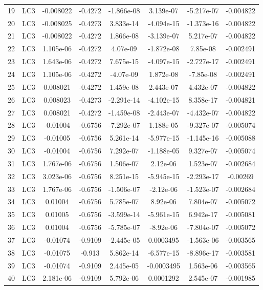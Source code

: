 \documentclass{article}%
\begin{document}
\begin{longtable}{| c c | c c c c c c |}
19&LC3&{-}0.008022&{-}0.4272&{-}1.866e{-}08&3.139e{-}07&{-}5.217e{-}07&{-}0.004822\\%
20&LC3&{-}0.008025&{-}0.4273&3.833e{-}14&{-}4.094e{-}15&{-}1.373e{-}16&{-}0.004822\\%
21&LC3&{-}0.008022&{-}0.4272&1.866e{-}08&{-}3.139e{-}07&5.217e{-}07&{-}0.004822\\%
22&LC3&1.105e{-}06&{-}0.4272&4.07e{-}09&{-}1.872e{-}08&7.85e{-}08&{-}0.002491\\%
23&LC3&1.643e{-}06&{-}0.4272&7.675e{-}15&{-}4.097e{-}15&{-}2.727e{-}17&{-}0.002491\\%
24&LC3&1.105e{-}06&{-}0.4272&{-}4.07e{-}09&1.872e{-}08&{-}7.85e{-}08&{-}0.002491\\%
25&LC3&0.008021&{-}0.4272&1.459e{-}08&2.443e{-}07&4.432e{-}07&{-}0.004822\\%
26&LC3&0.008023&{-}0.4273&{-}2.291e{-}14&{-}4.102e{-}15&8.358e{-}17&{-}0.004821\\%
27&LC3&0.008021&{-}0.4272&{-}1.459e{-}08&{-}2.443e{-}07&{-}4.432e{-}07&{-}0.004822\\%
28&LC3&{-}0.01004&{-}0.6756&{-}7.292e{-}07&1.188e{-}05&{-}9.327e{-}07&{-}0.005074\\%
29&LC3&{-}0.01005&{-}0.6756&5.261e{-}14&{-}5.977e{-}15&{-}1.145e{-}16&{-}0.005088\\%
30&LC3&{-}0.01004&{-}0.6756&7.292e{-}07&{-}1.188e{-}05&9.327e{-}07&{-}0.005074\\%
31&LC3&1.767e{-}06&{-}0.6756&1.506e{-}07&2.12e{-}06&1.523e{-}07&{-}0.002684\\%
32&LC3&3.023e{-}06&{-}0.6756&8.251e{-}15&{-}5.945e{-}15&{-}2.293e{-}17&{-}0.00269\\%
33&LC3&1.767e{-}06&{-}0.6756&{-}1.506e{-}07&{-}2.12e{-}06&{-}1.523e{-}07&{-}0.002684\\%
34&LC3&0.01004&{-}0.6756&5.785e{-}07&8.92e{-}06&7.804e{-}07&{-}0.005072\\%
35&LC3&0.01005&{-}0.6756&{-}3.599e{-}14&{-}5.961e{-}15&6.942e{-}17&{-}0.005081\\%
36&LC3&0.01004&{-}0.6756&{-}5.785e{-}07&{-}8.92e{-}06&{-}7.804e{-}07&{-}0.005072\\%
37&LC3&{-}0.01074&{-}0.9109&{-}2.445e{-}05&0.0003495&{-}1.563e{-}06&{-}0.003565\\%
38&LC3&{-}0.01075&{-}0.913&5.862e{-}14&{-}6.577e{-}15&{-}8.896e{-}17&{-}0.003581\\%
39&LC3&{-}0.01074&{-}0.9109&2.445e{-}05&{-}0.0003495&1.563e{-}06&{-}0.003565\\%
40&LC3&2.181e{-}06&{-}0.9109&5.792e{-}06&0.0001292&2.545e{-}07&{-}0.001985\\%

\end{longtable}
\end{document}

